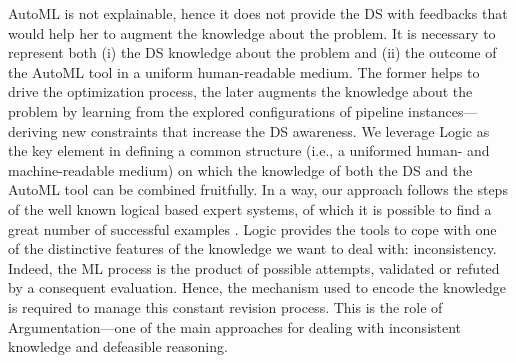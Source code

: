 \documentclass[5p,times]{elsarticle}
\begin{document}
AutoML is not explainable, hence it does not provide the DS with feedbacks that would help her to augment the knowledge about the problem.
It is necessary to represent both (i) the DS knowledge about the problem and (ii) the outcome of the AutoML tool in a uniform human-readable medium.
The former helps to drive the optimization process,
the later augments the knowledge about the problem by learning from the explored configurations of pipeline instances---deriving new constraints that increase the DS awareness.
We leverage Logic as the key element in defining a common structure (i.e., a uniformed human- and machine-readable medium) on which the knowledge of both the DS and the AutoML tool can be combined fruitfully.
In a way, our approach follows the steps of the well known logical based expert systems, of which it is possible to find a great number of successful examples \cite{tan17es}.
Logic provides the tools to cope with one of the distinctive features of the knowledge we want to deal with: inconsistency. Indeed, the ML process is the product of possible attempts, validated or refuted by a consequent evaluation. Hence, the mechanism used to encode the knowledge is required to manage this constant revision process.
This is the role of Argumentation---one of the main approaches for dealing with inconsistent knowledge and defeasible reasoning. 
\end{document}
